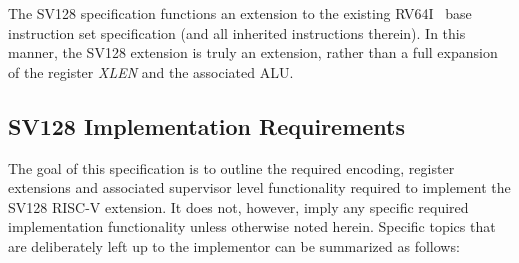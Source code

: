 \documentclass{article}
\begin{document}
The SV128 specification functions an extension to the existing RV64I~\cite{RVSpec} 
base instruction set specification (and all inherited instructions therein).  In this 
manner, the SV128 extension is truly an extension, rather than a full expansion 
of the register \textit{XLEN} and the associated ALU.

\subsection{SV128 Implementation Requirements}

The goal of this specification is to outline the required encoding, register extensions 
and associated supervisor level functionality required to implement the SV128 
RISC-V extension.  It does not, however, imply any specific required implementation 
functionality unless otherwise noted herein.  Specific topics that are deliberately 
left up to the implementor can be summarized as follows:
\end{document}
